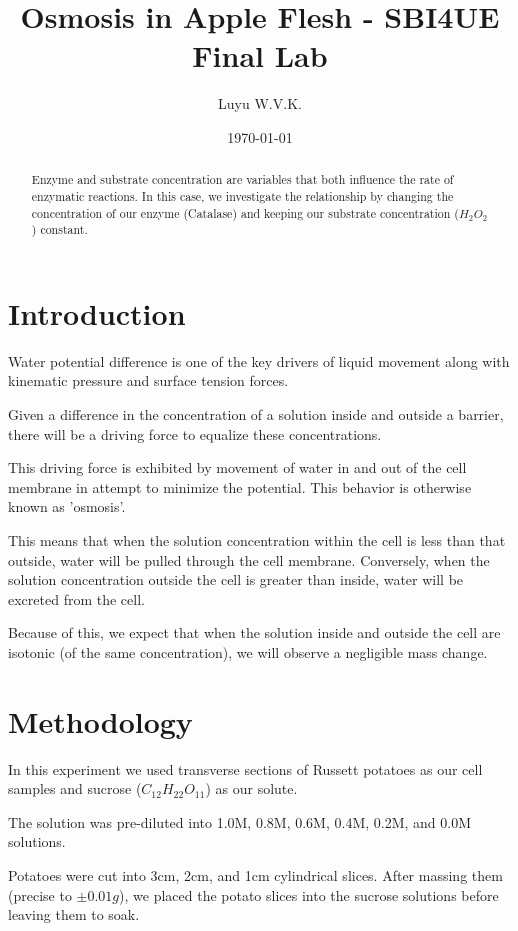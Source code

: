 \documentclass[prl,twocolumn,amsmath,amssymb,superscriptaddress]{revtex4-2}
\begin{document}
\title{Osmosis in Apple Flesh - SBI4UE Final Lab}
\author{Luyu W.V.K.}
\date{\today}

\begin{abstract}
    Enzyme and substrate concentration are variables that both influence the rate of enzymatic reactions. In this case, we investigate the relationship by changing the concentration of our enzyme (Catalase) and keeping our substrate concentration ($H_{2}O_2$) constant.
\end{abstract}
\maketitle

\section{Introduction}
Water potential difference is one of the key drivers of liquid movement along with kinematic pressure and surface tension forces.

Given a difference in the concentration of a solution inside and outside a barrier, there will be a driving force to equalize these concentrations.

This driving force is exhibited by movement of water in and out of the cell membrane in attempt to minimize the potential. This behavior is otherwise known as 'osmosis'.

This means that when the solution concentration within the cell is less than that outside, water will be pulled through the cell membrane. Conversely, when the solution concentration outside the cell is greater than inside, water will be excreted from the cell.

Because of this, we expect that when the solution inside and outside the cell are isotonic (of the same concentration), we will observe a negligible mass change.

\section{Methodology}
In this experiment we used transverse sections of Russett potatoes as our cell samples and sucrose ($C_{12}H_{22}O_{11}$) as our solute.

The solution was pre-diluted into 1.0M, 0.8M, 0.6M, 0.4M, 0.2M, and 0.0M solutions.

Potatoes were cut into 3cm, 2cm, and 1cm cylindrical slices. After massing them (precise to $\pm 0.01g$), we placed the potato slices into the sucrose solutions before leaving them to soak.
\end{document}
